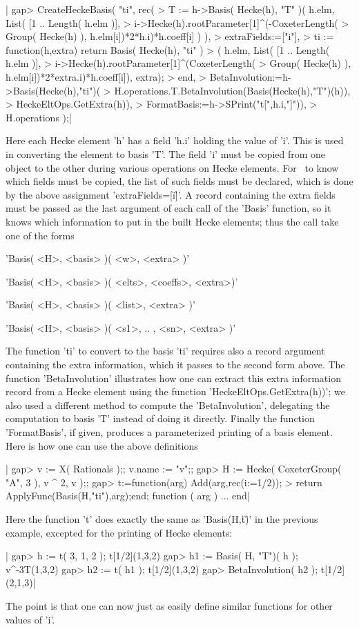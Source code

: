 |    gap> CreateHeckeBasis( "ti", rec(
    > T := h->Basis( Hecke(h), "T" )( h.elm, List( [1 .. Length( h.elm )],
    >  i->Hecke(h).rootParameter[1]^(-CoxeterLength(
    >          Group( Hecke(h) ), h.elm[i])*2*h.i)*h.coeff[i] ) ),
    > extraFields:=["i"],
    > ti := function(h,extra) return Basis( Hecke(h), "ti" )
    >    ( h.elm, List( [1 .. Length( h.elm )],
    >    i->Hecke(h).rootParameter[1]^(CoxeterLength(
    >        Group( Hecke(h) ), h.elm[i])*2*extra.i)*h.coeff[i]), extra);
    >    end,
    > BetaInvolution:=h->Basis(Hecke(h),"ti")(
    >   H.operations.T.BetaInvolution(Basis(Hecke(h),"T")(h)),
    >   HeckeEltOps.GetExtra(h)),
    > FormatBasis:=h->SPrint("t[",h.i,"]")),
    > H.operations );|

Here  each Hecke element  'h' has a  field 'h.i' holding  the value of 'i'.
This  is used in converting the element to basis 'T'. The field 'i' must be
copied  from one  object to  the other  during various  operations on Hecke
elements.  For \CHEVIE\ to  know which fields  must be copied,  the list of
such  fields  must  be  declared,  which  is  done  by the above assignment
'extraFields\:=[\"i\"]'.  A  record  containing  the  extra  fields must be
passed  as the last  argument of each  call of the  'Basis' function, so it
knows  which information to put in the  built Hecke elements; thus the call
take one of the forms

'Basis( <H>, <basis> )( <w>, <extra> )'

'Basis( <H>, <basis> )( <elts>, <coeffs>, <extra>)'

'Basis( <H>, <basis> )( <list>, <extra> )'

'Basis( <H>, <basis> )( <s1>, .. , <sn>, <extra> )'

The  function 'ti'  to convert  to the  basis 'ti'  requires also  a record
argument  containing the extra  information, which it  passes to the second
form  above. The function 'BetaInvolution'  illustrates how one can extract
this  extra  information  record  from  a  Hecke element using the function
'HeckeEltOps.GetExtra(h))';  we also used a different method to compute the
'BetaInvolution',  delegating the computation to basis 'T' instead of doing
it  directly.  Finally  the  function  'FormatBasis',  if given, produces a
parameterized  printing of  a basis  element. Here  is how  one can use the
above definitions\:

|    gap> v := X( Rationals );; v.name := "v";;
    gap> H := Hecke( CoxeterGroup( "A", 3 ), v ^ 2, v );;
    gap> t:=function(arg) Add(arg,rec(i:=1/2));
    >  return ApplyFunc(Basis(H,"ti"),arg);end;
    function ( arg ) ... end|

Here  the function  't' does  exactly the  same as  'Basis(H,\"t\")' in the
previous example, excepted for the printing of Hecke elements:

|    gap> h := t( 3, 1, 2 );
    t[1/2](1,3,2)
    gap> h1 := Basis( H, "T")( h );
    v^-3T(1,3,2)
    gap> h2 := t( h1 );
    t[1/2](1,3,2)
    gap> BetaInvolution( h2 );
    t[1/2](2,1,3)|

The  point is that one can now  just as easily define similar functions for
other values of 'i'.

